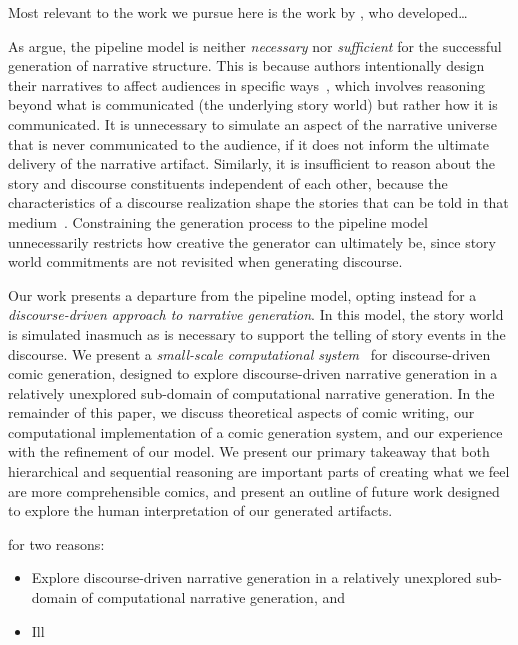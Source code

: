 Most relevant to the work we pursue here is the work by
, who developed\ldots


As \citeauthor{ronfard2014story} argue, the pipeline model is neither
\emph{necessary} nor \emph{sufficient} for the successful generation of
narrative structure. This is because authors intentionally design their
narratives to affect audiences in specific
ways~\cite{chatman1980story,bordwell1989making}, which involves reasoning beyond
what is communicated (the underlying story world) but rather how it is
communicated. It is unnecessary to simulate an aspect of the narrative universe
that is never communicated to the audience, if it does not inform the ultimate
delivery of the narrative artifact. Similarly, it is insufficient to reason
about the story and discourse constituents independent of each other, because
the characteristics of a discourse realization shape the stories that can be
told in that medium~\cite{herman2004toward}. Constraining the generation process
to the pipeline model unnecessarily restricts how creative the generator can
ultimately be, since story world commitments are not revisited when generating
discourse.

Our work presents a departure from the pipeline model, opting instead for a
\emph{discourse-driven approach to narrative generation}. In this model, the
story world is simulated inasmuch as is necessary to support the telling of
story events in the discourse. We present a \emph{small-scale computational
system}~\cite{montfort2012small} for discourse-driven comic generation, designed
to explore discourse-driven narrative generation in a relatively unexplored
sub-domain of computational narrative generation. In the remainder of this
paper, we discuss theoretical aspects of comic writing, our computational
implementation of a comic generation system, and our experience with the
refinement of our model. We present our primary takeaway that both hierarchical
and sequential reasoning are important parts of creating what we feel are more
comprehensible comics, and present an outline of future work designed to explore
the human interpretation of our generated artifacts.


for two reasons: \begin{itemize} \item Explore discourse-driven narrative
generation in a relatively unexplored sub-domain of computational narrative
generation, and \item Ill \end{itemize}

